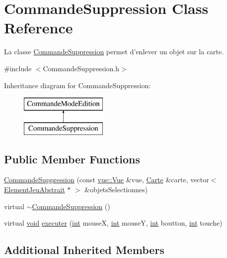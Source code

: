 \hypertarget{class_commande_suppression}{\section{Commande\-Suppression Class Reference}
\label{class_commande_suppression}
}


La classe \hyperlink{class_commande_suppression}{Commande\-Suppression} permet d'enlever un objet sur la carte.  




{\ttfamily \#include $<$Commande\-Suppression.\-h$>$}

Inheritance diagram for Commande\-Suppression\-:\begin{figure}[H]
\begin{center}
\leavevmode
\includegraphics[height=2.000000cm]{class_commande_suppression}
\end{center}
\end{figure}
\subsection*{Public Member Functions}
\begin{DoxyCompactItemize}
\item 
\hyperlink{class_commande_suppression_a6438eb61f3a3971c3e23f8d4e2d7628f}{Commande\-Suppression} (const \hyperlink{classvue_1_1_vue}{vue\-::\-Vue} \&vue, \hyperlink{class_carte}{Carte} \&carte, vector$<$ \hyperlink{class_element_jeu_abstrait}{Element\-Jeu\-Abstrait} $\ast$ $>$ \&objets\-Selectionnes)
\item 
virtual \hyperlink{class_commande_suppression_a8a8c9487c2f267bf008ef98dec1d808e}{$\sim$\-Commande\-Suppression} ()
\item 
virtual \hyperlink{wglew_8h_aeea6e3dfae3acf232096f57d2d57f084}{void} \hyperlink{class_commande_suppression_a8e3947cc0dcdcb85348e5c873f6def44}{executer} (\hyperlink{wglew_8h_a500a82aecba06f4550f6849b8099ca21}{int} mouse\-X, \hyperlink{wglew_8h_a500a82aecba06f4550f6849b8099ca21}{int} mouse\-Y, \hyperlink{wglew_8h_a500a82aecba06f4550f6849b8099ca21}{int} boutton, \hyperlink{wglew_8h_a500a82aecba06f4550f6849b8099ca21}{int} touche)
\end{DoxyCompactItemize}
\subsection*{Additional Inherited Members}


